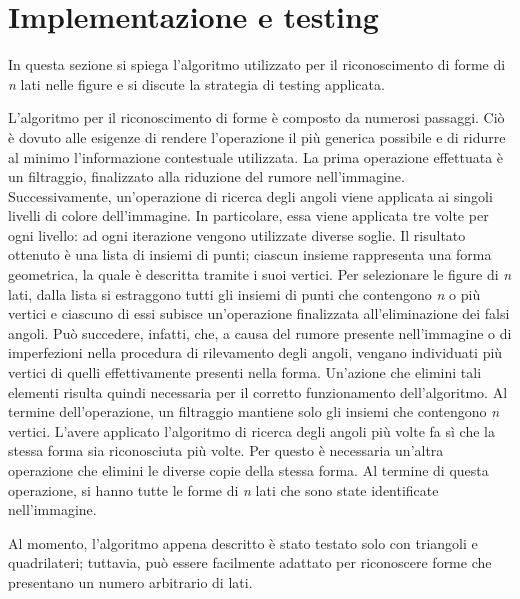 	\section*{Implementazione e testing}
		In questa sezione si spiega l'algoritmo utilizzato per il riconoscimento di forme di \emph{n} lati nelle figure e si discute la strategia di testing applicata.
		
		L'algoritmo per il riconoscimento di forme è composto da numerosi passaggi.
		Ciò è dovuto alle esigenze di rendere l'operazione il più generica possibile e di ridurre al minimo l'informazione contestuale utilizzata.
		La prima operazione effettuata è un filtraggio, finalizzato alla riduzione del rumore nell'immagine.
		Successivamente, un'operazione di ricerca degli angoli viene applicata ai singoli livelli di colore dell'immagine.
		In particolare, essa viene applicata tre volte per ogni livello: ad ogni iterazione vengono utilizzate diverse soglie.
		Il risultato ottenuto è una lista di insiemi di punti; ciascun insieme rappresenta una forma geometrica, la quale è descritta tramite i suoi vertici.
		Per selezionare le figure di \emph{n} lati, dalla lista si estraggono tutti gli insiemi di punti che contengono \emph{n} o più vertici e ciascuno di essi subisce un'operazione finalizzata all'eliminazione dei falsi angoli.
		Può succedere, infatti, che, a causa del rumore presente nell'immagine o di imperfezioni nella procedura di rilevamento degli angoli, vengano individuati più vertici di quelli effettivamente presenti nella forma.
		Un'azione che elimini tali elementi risulta quindi necessaria per il corretto funzionamento dell'algoritmo.
		Al termine dell'operazione, un filtraggio mantiene solo gli insiemi che contengono \emph{n} vertici.
		L'avere applicato l'algoritmo di ricerca degli angoli più volte fa sì che la stessa forma sia riconosciuta più volte.	
		Per questo è necessaria un'altra operazione che elimini le diverse copie della stessa forma.
		Al termine di questa operazione, si hanno tutte le forme di \emph{n} lati che sono state identificate nell'immagine. 

		Al momento, l'algoritmo appena descritto è stato testato solo con triangoli e quadrilateri; tuttavia, può essere facilmente adattato per riconoscere forme che presentano un numero arbitrario di lati. 
		
